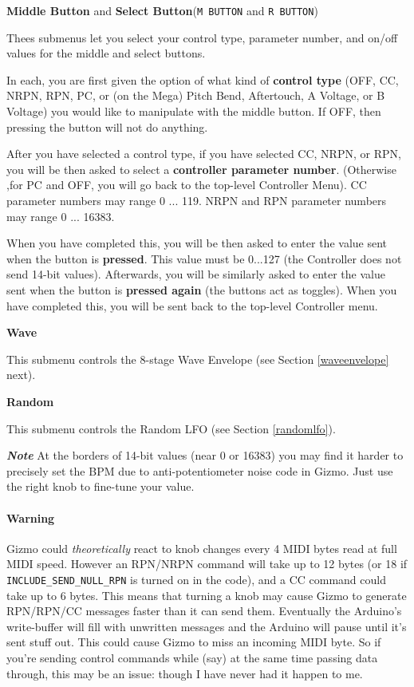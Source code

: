 \documentclass{article}
\begin{document}
\begin{description}
	\item{\bf Middle Button} and {\bf Select Button}\quad (\texttt{M BUTTON} and \texttt{R BUTTON})
	
	Thees submenus let you select your control type, parameter number, and on/off values for the middle and select buttons.
	
	In each, you are first given the option of what kind of {\bf control type} (OFF, CC, NRPN, RPN, PC, or (on the Mega) Pitch Bend, Aftertouch, A Voltage, or B Voltage) you would like to manipulate with the middle button.  If OFF, then pressing the button will not do anything.

	After you have selected a control type, if you have selected CC, NRPN, or RPN, you will be then asked to select a {\bf controller parameter number}.  (Otherwise ,for PC and OFF, you will go back to the top-level Controller Menu).  CC parameter numbers may range 0 ... 119.  NRPN and RPN parameter numbers may range 0 ... 16383.
	
	When you have completed this, you will be then asked to enter the value sent when the button is {\bf pressed}.  This value must be 0...127 (the Controller does not send 14-bit values).  Afterwards, you will be similarly asked to enter the value sent when the button is {\bf pressed again} (the buttons act as toggles).  When you have completed this, you will be sent back to the top-level Controller menu.
	
	\item{\bf Wave}
	
	This submenu controls the 8-stage Wave Envelope (see Section \ref{waveenvelope} next).

	\item{\bf Random}
	
	This submenu controls the Random LFO (see Section \ref{randomlfo}).

		\item{\bf \textit{Note}} At the borders of 14-bit values (near 0 or 16383) you may find it harder to precisely set the BPM due to anti-potentiometer noise code in Gizmo. Just use the right knob to fine-tune your value. 
	\end{description}
	
\paragraph{Warning} Gizmo could {\it theoretically} react to knob changes every 4 MIDI bytes read at full MIDI speed.  However an RPN/NRPN command will take up to 12 bytes (or 18 if \texttt{INCLUDE\_SEND\_NULL\_RPN} is turned on in the code), and a CC command could take up to 6 bytes.  This means that turning a knob may cause Gizmo to generate RPN/RPN/CC messages faster than it can send them.  Eventually the Arduino's write-buffer will fill with unwritten messages and the Arduino will pause until it's sent stuff out.  This could cause Gizmo to miss an incoming MIDI byte.  So if you're sending control commands while (say) at the same time passing data through, this may be an issue: though I have never had it happen to me.
\end{document}

